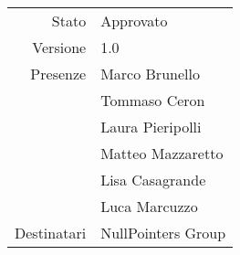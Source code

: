 \begin{center}
	\begin{tabular}{r|l}
		Stato & Approvato \\
		Versione & 1.0 \\
		Presenze & Marco Brunello \\
		& Tommaso Ceron \\
		& Laura Pieripolli \\
		& Matteo Mazzaretto \\
		& Lisa Casagrande \\
		& Luca Marcuzzo \\
		Destinatari & NullPointers Group \\
	\end{tabular}
\end{center}